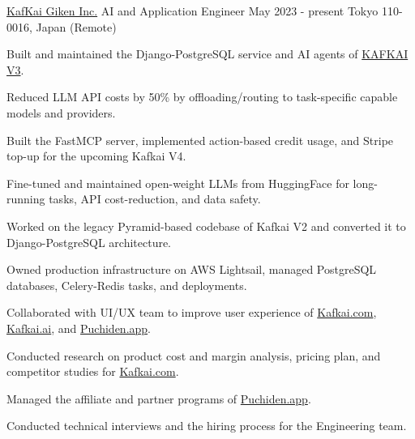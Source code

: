 \begin{cventries}


\cventry
    {\href{https://kafkai.com/}{KafKai Giken Inc.}} %
    {AI and Application Engineer} %
    {May 2023 - present} %
    {Tokyo 110-0016, Japan (Remote)} %
    {
      \begin{cvitems} %
        \item{Built and maintained the Django-PostgreSQL service and AI agents of \href{https://kafkai.com/}{\textcolor{Cerulean}{KAFKAI V3}}.}
        \item{Reduced LLM API costs by 50\% by offloading/routing to task-specific capable models and providers.}
        \item{Built the FastMCP server, implemented action-based credit usage, and Stripe top-up for the upcoming Kafkai V4.}
        \item{Fine-tuned and maintained open-weight LLMs from HuggingFace for long-running tasks, API cost-reduction, and data safety.}
        \item{Worked on the legacy Pyramid-based codebase of Kafkai V2 and converted it to Django-PostgreSQL architecture.}
        \item{Owned production infrastructure on AWS Lightsail, managed PostgreSQL databases, Celery-Redis tasks, and deployments.}
        \item{Collaborated with UI/UX team to improve user experience of \href{https://kafkai.com/}{\textcolor{Cerulean}{Kafkai.com}}, \href{https://kafkai.ai/}{\textcolor{Cerulean}{Kafkai.ai}}, and \href{https://puchiden.app/}{\textcolor{Cerulean}{Puchiden.app}}.}
        \item{Conducted research on product cost and margin analysis, pricing plan, and competitor studies for \href{https://kafkai.com/}{\textcolor{Cerulean}{Kafkai.com}}.}
        \item{Managed the affiliate and partner programs of \href{https://puchiden.app/}{\textcolor{Cerulean}{Puchiden.app}}.}
        \item{Conducted technical interviews and the hiring process for the Engineering team.}
      \end{cvitems}
    }



\end{cventries}
